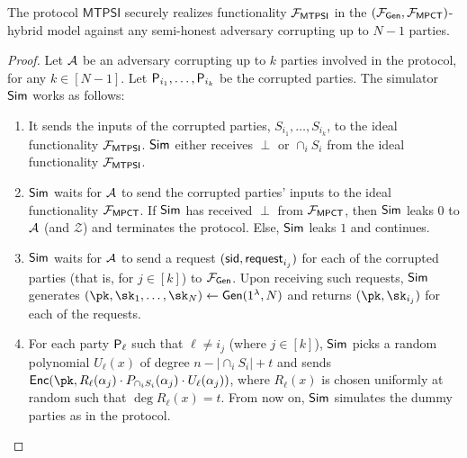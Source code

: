 \begin{theorem}
The protocol $\mathsf{MTPSI}$ securely realizes functionality $\mathcal{F}_{\mathsf{MTPSI}}$ in the $(\mathcal{F}_{\mathsf{Gen}},\mathcal{F}_{\mathsf{MPCT}})$-hybrid model against any semi-honest adversary corrupting up to $N-1$ parties.
\end{theorem}{}
\begin{proof}
Let $\mathcal{A}$ be an adversary corrupting up to $k$ parties involved in the protocol, for any $k\in[N-1]$. Let $\mathsf{P}_{i_1}, \dots , \mathsf{P}_{i_{k}}$ be the corrupted parties. The simulator $\mathsf{Sim}$ works as follows:
\begin{enumerate}
    \item It sends the inputs of the corrupted parties, $S_{i_1},\dots, S_{i_k}$, to the ideal functionality $\mathcal{F}_{\mathsf{MTPSI}}$. $\mathsf{Sim}$ either receives $\perp$ or $\cap_i S_i$ from the ideal functionality $\mathcal{F}_{\mathsf{MTPSI}}$.
    \item $\mathsf{Sim}$ waits for $\mathcal{A}$ to send the corrupted parties' inputs to the ideal functionality $\mathcal{F}_{\mathsf{MPCT}}$. If $\mathsf{Sim}$ has received $\perp$ from $\mathcal{F}_{\mathsf{MPCT}}$, then $\mathsf{Sim}$ leaks $0$ to $\mathcal{A}$ (and $\mathcal{Z}$) and terminates the protocol. Else, $\mathsf{Sim}$ leaks $1$ and continues.
    \item $\mathsf{Sim}$ waits for $\mathcal{A}$ to send a request $(\mathsf{sid},\mathsf{request}_{i_j})$ for each of the corrupted parties (that is, for $j\in[k]$) to $\mathcal{F}_\mathsf{Gen}$. Upon receiving such requests, $\mathsf{Sim}$ generates $(\pk,\sk_{1},\dots, \sk_N)\leftarrow \mathsf{Gen}(1^\lambda,N)$ and returns $(\pk,\sk_{i_j})$ for each of the requests.
    \item For each party $\mathsf{P}_{\ell}$ such that $\ell\neq i_j$ (where $j\in [k]$), $\mathsf{Sim}$ picks a random polynomial $U_\ell(x)$ of degree $n-|\cap_i S_i|+t$ and sends $\mathsf{Enc}(\pk,R_\ell(\alpha_j)\cdot P_{\cap_i S_i}(\alpha_j) \cdot U_\ell(\alpha_j))$, where $R_\ell(x)$ is chosen uniformly at random such that $\deg R_\ell(x)=t$. From now on, $\mathsf{Sim}$ simulates the dummy parties as in the protocol.
\end{enumerate}{}


\end{proof}
